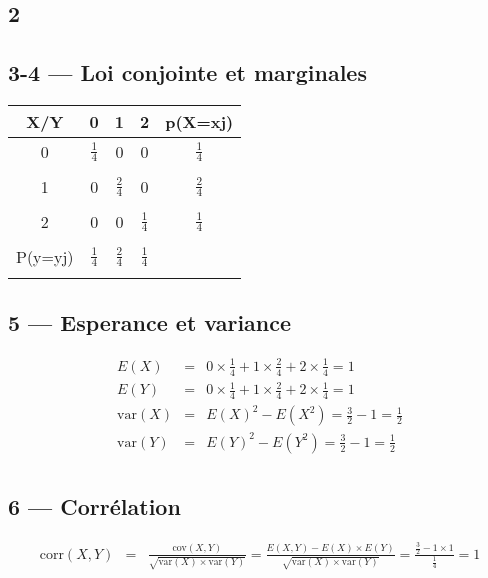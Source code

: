 \documentclass[a4paper, 11pt]{book}
\newcommand{\var}{\textrm{var}}
\newcommand{\corr}{\textrm{corr}}
\newcommand{\cov}{\textrm{cov}}
\begin{document}
	\subsection*{2}

	\subsection*{3-4 --- Loi conjointe et marginales}
	\begin{tabular}{c|c|c|c|c|}
		X/Y&0&1&2&p(X=xj)\\
		\hline
		0&$\frac{1}{4}$&0&0&$\frac{1}{4}$\\&&&&\\
		\hline
		1&0&$\frac{2}{4}$&0&$\frac{2}{4}$\\&&&&\\
		\hline
		2&0&0&$\frac{1}{4}$&$\frac{1}{4}$\\&&&&\\
		\hline
		P(y=yj)&$\frac{1}{4}$&$\frac{2}{4}$&$\frac{1}{4}$&\\&&&&\\
		\hline
	\end{tabular}

	\subsection*{5 --- Esperance et variance}
	\begin{eqnarray*}
		E(X)&=& 0 \times \frac{1}{4} + 1 \times \frac{2}{4} + 2 \times \frac{1}{4} = 1\\
		E(Y)&=& 0 \times \frac{1}{4} + 1 \times \frac{2}{4} + 2 \times \frac{1}{4} = 1\\
		\var(X) &=& E(X)^2 - E(X^2) = \frac{3}{2} - 1 = \frac{1}{2}\\
		\var(Y) &=& E(Y)^2 - E(Y^2) = \frac{3}{2} - 1 = \frac{1}{2}\\
	\end{eqnarray*}
	\subsection*{6 --- Corrélation}
	\begin{eqnarray*}
		\corr(X,Y) &=& \frac{\cov(X,Y)}{\sqrt{\var(X) \times \var(Y)}} = \frac{E(X,Y) - E(X) \times E(Y)}{\sqrt{\var(X)\times\var(Y)}} = \frac{\frac{3}{2} - 1 \times 1}{\frac{1}{4}} = 1\\
	\end{eqnarray*}
\end{document}

